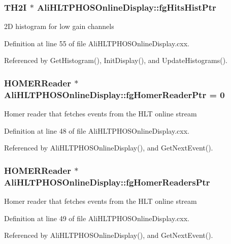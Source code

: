 \subsubsection{\setlength{\rightskip}{0pt plus 5cm}TH2I $\ast$ {\bf Ali\-HLTPHOSOnline\-Display::fg\-Hits\-Hist\-Ptr}\hspace{0.3cm}{\tt  [static, private]}}\label{classAliHLTPHOSOnlineDisplay_v41}


2D histogram for low gain channels 

Definition at line 55 of file Ali\-HLTPHOSOnline\-Display.cxx.

Referenced by Get\-Histogram(), Init\-Display(), and Update\-Histograms().
\subsubsection{\setlength{\rightskip}{0pt plus 5cm}HOMERReader $\ast$ {\bf Ali\-HLTPHOSOnline\-Display::fg\-Homer\-Reader\-Ptr} = 0\hspace{0.3cm}{\tt  [static, private]}}\label{classAliHLTPHOSOnlineDisplay_v51}


Homer reader that fetches events from the HLT online stream 

Definition at line 48 of file Ali\-HLTPHOSOnline\-Display.cxx.

Referenced by Ali\-HLTPHOSOnline\-Display(), and Get\-Next\-Event().
\subsubsection{\setlength{\rightskip}{0pt plus 5cm}HOMERReader $\ast$ {\bf Ali\-HLTPHOSOnline\-Display::fg\-Homer\-Readers\-Ptr}\hspace{0.3cm}{\tt  [static, private]}}\label{classAliHLTPHOSOnlineDisplay_v52}


Homer reader that fetches events from the HLT online stream 

Definition at line 49 of file Ali\-HLTPHOSOnline\-Display.cxx.

Referenced by Ali\-HLTPHOSOnline\-Display(), and Get\-Next\-Event().

